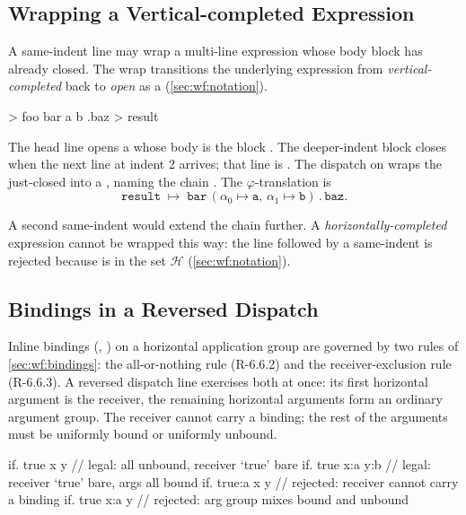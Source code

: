 \subsection{Wrapping a Vertical-completed Expression}\label{app:ex:vmethod-wrap}

A same-indent  line may wrap a multi-line expression whose
  body block has already closed.
The wrap transitions the underlying expression from
  \emph{vertical-completed} back to \emph{open} as a 
  (\cref{sec:wf:notation}).

\begin{ffcode}
[] > foo
  bar
    a
    b
  .baz > result
\end{ffcode}

The head line  opens a  whose body is the
  block .
The deeper-indent block closes when the next line at indent 2 arrives;
  that line is .
The dispatch on  wraps the just-closed  into
  a , naming the chain .
The \(\varphi\)-translation is
\begin{equation*}
  \mathtt{result}\;\mapsto\;
    \mathtt{bar}\,(\alpha_0 \mapsto \mathtt{a},\,\alpha_1 \mapsto \mathtt{b})\,.\,\mathtt{baz}.
\end{equation*}

A second same-indent  would extend the chain further.
A \emph{horizontally-completed} expression cannot be wrapped this way:
  the line  followed by a same-indent  is rejected
  because  is in the set \(\mathcal{H}\)
  (\cref{sec:wf:notation}).

\subsection{Bindings in a Reversed Dispatch}\label{app:ex:binding-chain}

Inline bindings (, ) on a horizontal application group
  are governed by two rules of \cref{sec:wf:bindings}:
  the all-or-nothing rule (R-6.6.2) and the receiver-exclusion rule
  (R-6.6.3).
A reversed dispatch line exercises both at once: its first horizontal
  argument is the receiver, the remaining horizontal arguments form an
  ordinary argument group.
The receiver cannot carry a binding;
  the rest of the arguments must be uniformly bound or uniformly
  unbound.

\begin{ffcode}
if. true x y              // legal: all unbound, receiver `true' bare
if. true x:a y:b          // legal: receiver `true' bare, args all bound
if. true:a x y            // rejected: receiver cannot carry a binding
if. true x:a y            // rejected: arg group mixes bound and unbound
\end{ffcode}

